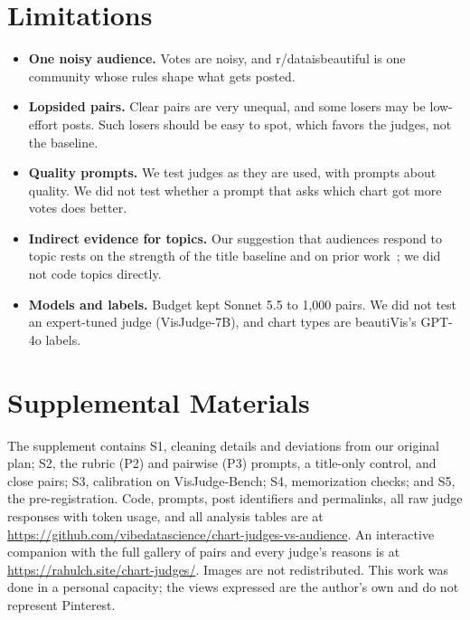 \documentclass{vgtc}
\newif\ifanonymous\anonymousfalse
\begin{document}
\section{Limitations}
\begin{itemize}
\item \textbf{One noisy audience.} Votes are noisy, and r/dataisbeautiful is one community whose rules shape what gets posted.
\item \textbf{Lopsided pairs.} Clear pairs are very unequal, and some losers may be low-effort posts. Such losers should be easy to spot, which favors the judges, not the baseline.
\item \textbf{Quality prompts.} We test judges as they are used, with prompts about quality. We did not test whether a prompt that asks which chart got more votes does better.
\item \textbf{Indirect evidence for topics.} Our suggestion that audiences respond to topic rests on the strength of the title baseline and on prior work~\cite{kauer2021public}; we did not code topics directly.
\item \textbf{Models and labels.} Budget kept Sonnet 5.5 to 1{,}000 pairs. We did not test an expert-tuned judge (VisJudge-7B), and chart types are beautiVis's GPT-4o labels.
\end{itemize}

\section*{Supplemental Materials}
\label{sec:supplemental_materials}
The supplement contains S1, cleaning details and deviations from our original plan; S2, the rubric (P2) and pairwise (P3) prompts, a title-only control, and close pairs; S3, calibration on VisJudge-Bench; S4, memorization checks; and S5, the pre-registration. \ifanonymous Code, prompts, post identifiers and permalinks, all raw judge responses with token usage, and all analysis tables are in an anonymized repository (link withheld for review).\else Code, prompts, post identifiers and permalinks, all raw judge responses with token usage, and all analysis tables are at \url{https://github.com/vibedatascience/chart-judges-vs-audience}. An interactive companion with the full gallery of pairs and every judge's reasons is at \url{https://rahulch.site/chart-judges/}.\fi{} Images are not redistributed.\ifanonymous\else{} This work was done in a personal capacity; the views expressed are the author's own and do not represent Pinterest.\fi
\end{document}
